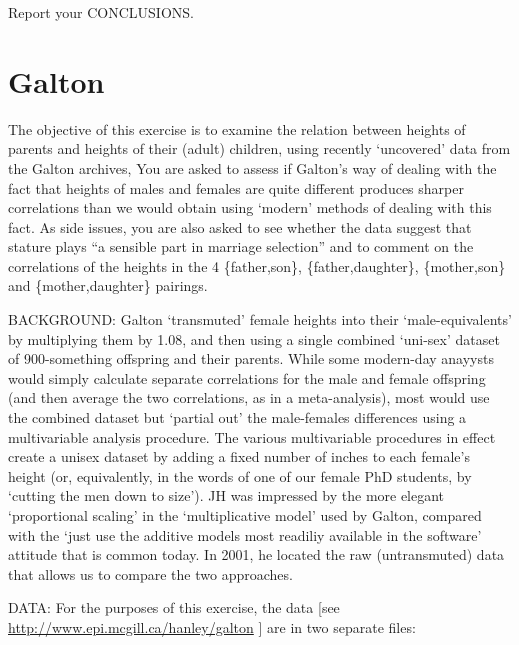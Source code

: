 \documentclass[]{book}
\begin{document}
Report your CONCLUSIONS.

\hypertarget{galton}{%
\section{Galton}\label{galton}}

The objective of this exercise is to examine the relation between heights of parents and heights of their (adult) children, using recently `uncovered' data from the Galton archives, You are asked to assess if Galton's way of dealing with the fact that heights of males and females are quite different produces sharper correlations than we would obtain using `modern' methods of dealing with this fact. As side issues, you are also asked to see whether the data suggest that stature plays ``a sensible part in marriage selection'' and to comment on the correlations of the heights in the 4 \{father,son\}, \{father,daughter\}, \{mother,son\} and \{mother,daughter\} pairings.

BACKGROUND: Galton `transmuted' female heights into their `male-equivalents' by multiplying them by 1.08, and then using a single combined `uni-sex' dataset of 900-something offspring and their parents. While some modern-day anayysts would simply calculate separate correlations for the male and female offspring (and then average the two correlations, as in a meta-analysis), most would use the combined dataset but `partial out' the male-females differences using a multivariable analysis procedure. The various multivariable procedures in effect create a unisex dataset by adding a fixed number of inches to each female's height (or, equivalently, in the words of one of our female PhD students, by `cutting the men down to size'). JH was impressed by the more elegant `proportional scaling' in the `multiplicative model' used by Galton, compared with the `just use the additive models most readiliy available in the software' attitude that is common today. In 2001, he located the raw (untransmuted) data that allows us to compare the two approaches.

DATA: For the purposes of this exercise, the data {[}see \url{http://www.epi.mcgill.ca/hanley/galton} {]} are in two separate files:
\end{document}
